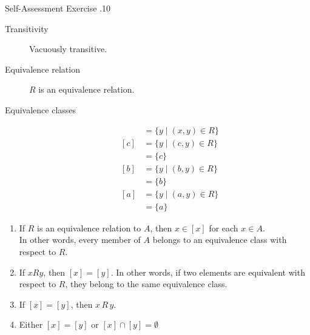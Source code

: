 \documentclass[../notes.tex]{subfiles}
\begin{document}
\begin{exercise}{Self-Assessment Exercise \thechapter.10}
\begin{enumerate}
\begin{enumerate}[label=(\alph*)]
\begin{description}
										\item[Transitivity] Vacuously transitive.
										\item[Equivalence relation] $R$ is an equivalence relation.
										\item[Equivalence classes]
											\begin{align*}
												[x] &= \{y \mid (x, y) \in R\}\\
												[c] &= \{y \mid (c, y) \in R\}\\
												&= \{c\}\\
												[b] &= \{y \mid (b, y) \in R\}\\
												&= \{b\}\\
												[a] &= \{y \mid (a, y) \in R\}\\
												&= \{a\}
											\end{align*}    
									\end{description}
							\end{enumerate}
					\end{enumerate}
				\end{exercise}
				\pagebreak
				\begin{theorem}
					\begin{enumerate}[label=(\roman*)]
						\item If $R$ is an equivalence relation to $A$, then $x \in [x]$ for each $x \in A$.\\
							In other words, every member of $A$ belongs to an equivalence class with respect to $R$.
						\item If $x R y$, then $[x] = [y]$. In other words, if two elements are equivalent with respect to $R$, they belong to the same equivalence class.
						\item If $[x] = [y]$, then $x \, R \, y$.
						\item Either $[x] = [y]$ or $[x] \cap [y] = \emptyset$
					\end{enumerate}
				\end{theorem}
\end{document}
